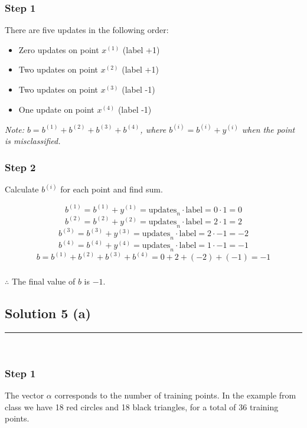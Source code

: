 \documentclass{article}
\begin{document}
\subsubsection*{Step 1}
\parbox{\textwidth}{
  There are five updates in the following order:
  \begin{itemize}
      \item Zero updates on point $x^{(1)}$ (label +1)
      \item Two updates on point $x^{(2)}$ (label +1)
      \item Two updates on point $x^{(3)}$ (label -1)
      \item One update on point $x^{(4)}$ (label -1)
  \end{itemize}
\textit{Note: $b= b^{(1)}+b^{(2)}+b^{(3)}+b^{(4)}$, where $b^{(i)} = b^{(i)} + y^{(i)}$ when the point is misclassified.}
}

\subsubsection*{Step 2}
\parbox{\textwidth}{
Calculate $b^{(i)}$ for each point and find sum.
}

$$b^{(1)} = b^{(1)} + y^{(1)} = \text{updates}_n \cdot \text{label} = 0 \cdot 1 = 0$$
$$b^{(2)} = b^{(2)} + y^{(2)} = \text{updates}_n \cdot \text{label} = 2 \cdot 1 = 2$$
$$b^{(3)} = b^{(3)} + y^{(3)} = \text{updates}_n \cdot \text{label} = 2 \cdot -1 = -2$$
$$b^{(4)} = b^{(4)} + y^{(4)} = \text{updates}_n \cdot \text{label} = 1 \cdot -1 = -1$$
$$b = b^{(1)} + b^{(2)} + b^{(3)} + b^{(4)} = 0 + 2 + (-2) + (-1) = -1$$

\subsubsection*{\normalfont}{$\therefore$ The final value of $b$ is $-1$.}

\newpage

\subsection*{Solution 5 (a)}
\noindent\rule{\textwidth}{0.4pt}\\

\subsubsection*{Step 1}
\parbox{\textwidth}{
The vector $\alpha$ corresponds to the number of training points. 
In the example from class we have 18 red circles and 18 black triangles, for a total of 36 training points.
}
\end{document}
